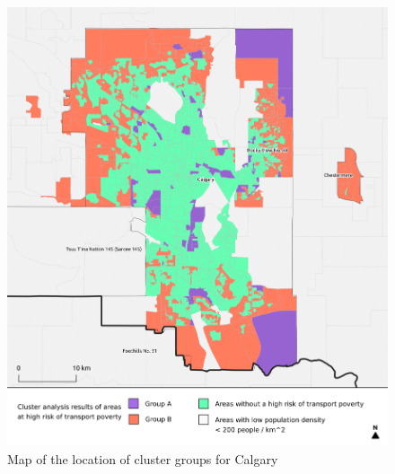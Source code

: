 \documentclass[11 pt, letterpaper]{article}
\begin{document}
{\begin{figure}[H]
	\caption{Map of the location of cluster groups for Calgary} 
	\label{C_cgy}
	\centerline{\includegraphics[width=6.5in]{figures/cluster_maps/C_cgy}}
	\vspace{2mm}
\end{figure}

}
\end{document}
